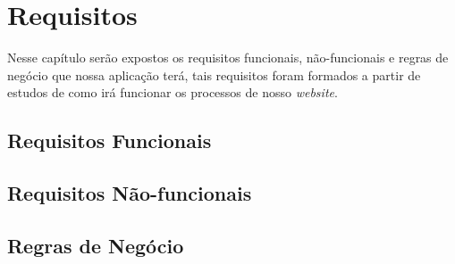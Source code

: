 \chapter{Requisitos}

Nesse capítulo serão expostos os requisitos funcionais, não-funcionais e regras de negócio que nossa aplicação terá, tais requisitos foram formados a partir de estudos de como irá funcionar os processos de nosso \emph{website}.

\section{Requisitos Funcionais}

\section{Requisitos Não-funcionais}

\section{Regras de Negócio}